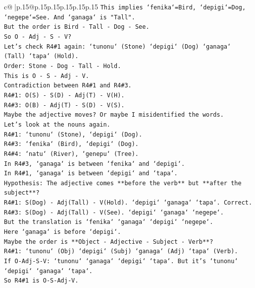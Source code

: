 \documentclass{article}
\begin{document}
{\begin{supertabular}{c@{$\;$}|p{.15\linewidth}@{}p{.15\linewidth}p{.15\linewidth}p{.15\linewidth}p{.15\linewidth}p{.15\linewidth}}
{{{\texttt{This implies `fenika`=Bird, `depigi`=Dog, `negepe`=See. And `ganaga` is "Tall".} \\
\texttt{But the order is Bird {-} Tall {-} Dog {-} See.} \\
\texttt{So O {-} Adj {-} S {-} V?} \\
\texttt{Let's check R4\#1 again: `tunonu` (Stone) `depigi` (Dog) `ganaga` (Tall) `tapa` (Hold).} \\
\texttt{Order: Stone {-} Dog {-} Tall {-} Hold.} \\
\texttt{This is O {-} S {-} Adj {-} V.} \\
\texttt{Contradiction between R4\#1 and R4\#3.} \\
\texttt{R4\#1: O(S) {-} S(D) {-} Adj(T) {-} V(H).} \\
\texttt{R4\#3: O(B) {-} Adj(T) {-} S(D) {-} V(S).} \\
\texttt{Maybe the adjective moves? Or maybe I misidentified the words.} \\
\texttt{Let's look at the nouns again.} \\
\texttt{R4\#1: `tunonu` (Stone), `depigi` (Dog).} \\
\texttt{R4\#3: `fenika` (Bird), `depigi` (Dog).} \\
\texttt{R4\#4: `natu` (River), `genepu` (Tree).} \\
\texttt{In R4\#3, `ganaga` is between `fenika` and `depigi`.} \\
\texttt{In R4\#1, `ganaga` is between `depigi` and `tapa`.} \\
\texttt{Hypothesis: The adjective comes **before the verb** but **after the subject**?} \\
\texttt{R4\#1: S(Dog) {-} Adj(Tall) {-} V(Hold). `depigi` `ganaga` `tapa`. Correct.} \\
\texttt{R4\#3: S(Dog) {-} Adj(Tall) {-} V(See). `depigi` `ganaga` `negepe`.} \\
\texttt{But the translation is `fenika` `ganaga` `depigi` `negepe`.} \\
\texttt{Here `ganaga` is before `depigi`.} \\
\texttt{Maybe the order is **Object {-} Adjective {-} Subject {-} Verb**?} \\
\texttt{R4\#1: `tunonu` (Obj) `depigi` (Subj) `ganaga` (Adj) `tapa` (Verb).} \\
\texttt{If O{-}Adj{-}S{-}V: `tunonu` `ganaga` `depigi` `tapa`. But it's `tunonu` `depigi` `ganaga` `tapa`.} \\
\texttt{So R4\#1 is O{-}S{-}Adj{-}V.} \\
}}}
\end{supertabular}}
\end{document}
